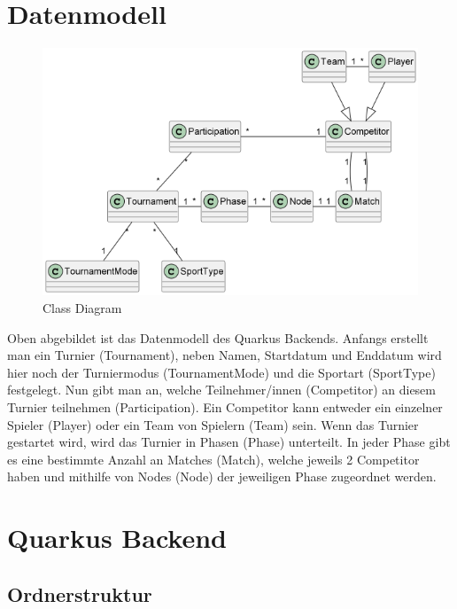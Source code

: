 \section{Datenmodell}

\begin{figure}[H]
    \includegraphics[scale=1]{pics/backend/class_diagram.png}
    \caption{Class Diagram}
\end{figure}

Oben abgebildet ist das Datenmodell des Quarkus Backends. Anfangs erstellt man ein Turnier (Tournament), neben Namen, Startdatum und Enddatum 
wird hier noch der Turniermodus (TournamentMode) und die Sportart (SportType) festgelegt. Nun gibt man an, welche Teilnehmer/innen (Competitor) an diesem Turnier teilnehmen (Participation). 
Ein Competitor kann entweder ein einzelner Spieler (Player) oder ein Team von Spielern (Team) sein.
Wenn das Turnier gestartet wird, wird das Turnier in Phasen (Phase) unterteilt. In jeder Phase gibt es eine bestimmte Anzahl an Matches (Match), welche jeweils 2 Competitor haben und mithilfe von Nodes (Node) 
der jeweiligen Phase zugeordnet werden.

\section{Quarkus Backend}

\subsection{Ordnerstruktur}

